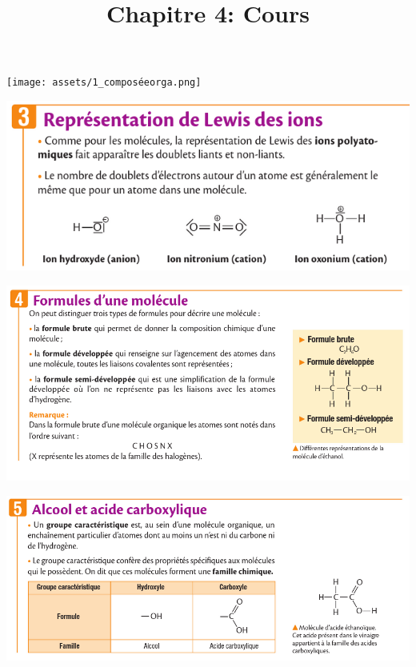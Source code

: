\documentclass[10pt]{article}
\newcommand{\titreActivite}{Chapitre 4: Cours} %
\begin{document}
\date{}
\title{\titreActivite}
\maketitle %
\begin{center}

	\begin{minipage}[c]{0.45\textwidth}
		\texttt{[image: assets/1\_composéeorga.png]}
	\end{minipage}
	\hspace{0.05\textwidth}
	\begin{minipage}[c]{0.45\textwidth}
		\includegraphics[scale=0.38]{assets/3lewis_ions.png}
	\end{minipage}

	\vspace{10pt}


	\includegraphics[scale=0.5]{assets/4formules_chimiques.png}

	\vspace{10pt}

	\includegraphics[scale=0.5]{assets/5alcool_acide.png}



\end{center}
\end{document}
